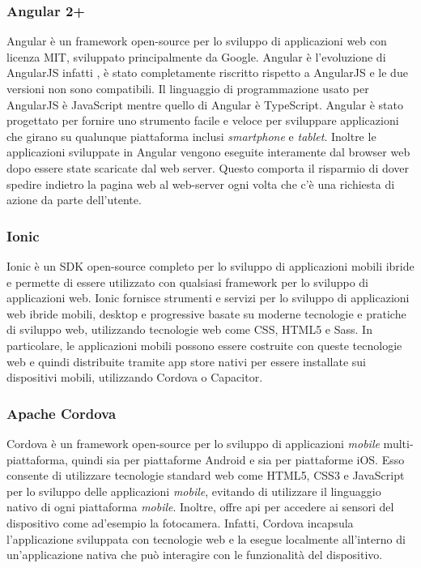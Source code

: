 \subsubsection*{Angular 2+}
Angular è un framework \gls{open-source}\ap{[g]} per lo sviluppo di applicazioni web con \gls{licenza MIT}\ap{[g]}, sviluppato principalmente da Google. Angular è l'evoluzione di AngularJS infatti , è stato completamente riscritto rispetto a AngularJS e le due versioni non sono compatibili. Il linguaggio di programmazione usato per AngularJS è JavaScript mentre quello di Angular è TypeScript. Angular è stato progettato per fornire uno strumento facile e veloce per sviluppare applicazioni che girano su qualunque piattaforma inclusi \emph{smartphone} e \emph{tablet}. Inoltre le applicazioni sviluppate in Angular vengono eseguite interamente dal \gls{browser web}\ap{[g]} dopo essere state scaricate dal web \gls{server}\ap{[g]}. Questo comporta il risparmio di dover spedire indietro la pagina web al web-server ogni volta che c'è una richiesta di azione da parte dell'utente. 

\subsubsection*{Ionic}
Ionic è un SDK \gls{open-source}\ap{[g]} completo per lo sviluppo di applicazioni mobili ibride e permette di essere utilizzato con qualsiasi framework per lo sviluppo di applicazioni web. Ionic fornisce strumenti e servizi per lo sviluppo di applicazioni web ibride mobili, desktop e progressive basate su moderne tecnologie e pratiche di sviluppo web, utilizzando tecnologie web come \gls{CSS}, \gls{HTML}5 e Sass. In particolare, le applicazioni mobili possono essere costruite con queste tecnologie web e quindi distribuite tramite app store nativi per essere installate sui dispositivi mobili, utilizzando Cordova o Capacitor. 

\subsubsection*{Apache Cordova}
Cordova è un \gls{framework}\ap{[g]} \gls{open-source}\ap{[g]} per lo sviluppo di applicazioni \emph{mobile} multi-piattaforma, quindi sia per piattaforme \gls{Android} e sia per piattaforme \gls{iOS}. Esso consente di utilizzare tecnologie standard web come \gls{HTML}5, \gls{CSS}3 e JavaScript per lo sviluppo delle applicazioni \emph{mobile}, evitando di utilizzare il linguaggio nativo di ogni piattaforma \emph{mobile}. Inoltre, offre \gls{api}\ap{[g]} per accedere ai sensori del dispositivo come ad'esempio la fotocamera. Infatti, Cordova incapsula l'applicazione sviluppata con tecnologie web e la esegue localmente all’interno di un’applicazione nativa che può interagire con le funzionalità del dispositivo.

